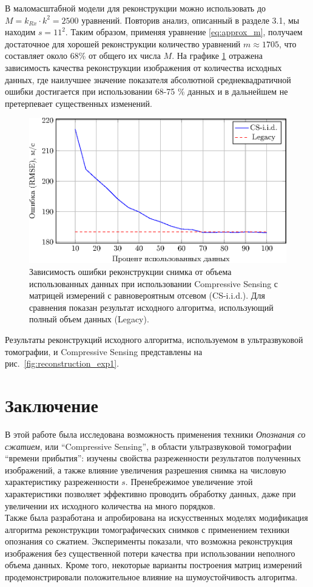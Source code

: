 \documentclass[14pt]{matmex-diploma}
\begin{document}
В маломасштабной модели для реконструкции можно использовать до $M = k_{Rx} \cdot k^2 = 2500$ уравнений. Повторив анализ, описанный в разделе 3.1,
мы находим $s=11^2$.
Таким образом, применяя уравнение \eqref{eq:approx_m}, получаем достаточное для хорошей реконструкции количество уравнений $m \approx 1705$, что составляет около 68\% от общего их числа $M$. На графике \ref{fig:used_equations} отражена зависимость качества реконструкции изображения от количества исходных данных, где наилучшее значение показателя абсолютной среднеквадратичной ошибки  достигается при использовании 68-75 \% данных и в дальнейшем не претерпевает существенных изменений.

\begin{figure}[h]
    \centering
    \includegraphics[width=0.8\linewidth]{pics_eps/rmse_seq.eps}
    \caption{\small Зависимость ошибки реконструкции снимка от объема использованных данных при использовании Compressive Sensing с матрицей измерений с равновероятным отсевом (CS-i.i.d.). Для сравнения показан результат исходного алгоритма, использующий полный объем данных (Legacy).}
    \label{fig:used_equations}
\end{figure}


Результаты реконструкций исходного алгоритма, используемом в ультразвуковой томографии, и Compressive Sensing представлены на рис.~\ref{fig:reconstruction_exp1}.


\section{Заключение} \label{sec:concluding}
В этой работе была исследована возможность применения техники \textit{Опознания со сжатием}, или ``Compressive Sensing'', в области ультразвуковой томографии ``времени прибытия'': изучены свойства разреженности результатов полученных изображений, а также влияние увеличения разрешения снимка на числовую характеристику разреженности $s$. Пренебрежимое увеличение этой характеристики позволяет эффективно проводить обработку данных, даже при увеличении их исходного количества на много порядков. \\
Также была разработана и апробирована на искусственных моделях модификация алгоритма реконструкции томографических снимков с применением техники опознания со сжатием. Эксперименты показали, что возможна реконструкция изображения без существенной потери качества при использовании неполного объема данных. Кроме того, некоторые варианты построения матриц измерений продемонстрировали положительное влияние на шумоустойчивость алгоритма.
\end{document}
